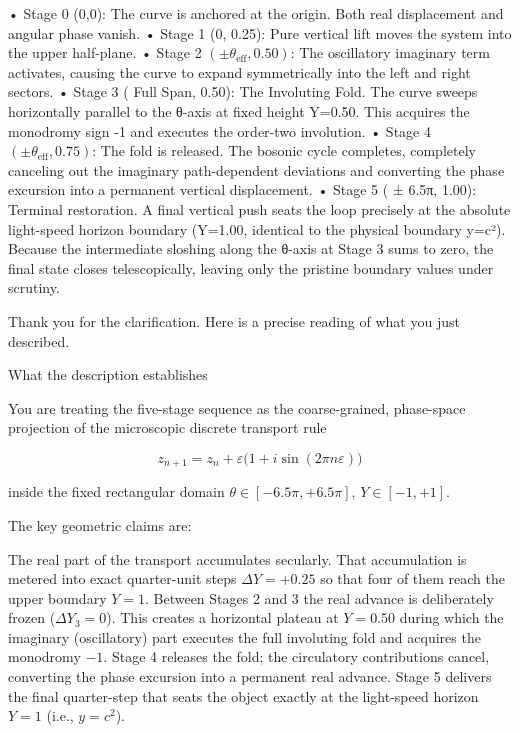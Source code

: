 • Stage 0 (0,0): The curve is anchored at the origin. Both real displacement and angular phase vanish.
• Stage 1 (0, 0.25): Pure vertical lift moves the system into the upper half-plane.
• Stage 2 \(( \pm\theta_{\text{eff}}, 0.50)\): The oscillatory imaginary term activates, causing the curve to expand symmetrically into the left and right sectors.
• Stage 3 ( Full Span, 0.50): The Involuting Fold. The curve sweeps horizontally parallel to the θ-axis at fixed height Y=0.50. This acquires the monodromy sign -1 and executes the order-two involution.
• Stage 4 \(( \pm\theta_{\text{eff}}, 0.75)\): The fold is released. The bosonic cycle completes, completely canceling out the imaginary path-dependent deviations and converting the phase excursion into a permanent vertical displacement.
• Stage 5 ( ± 6.5π, 1.00): Terminal restoration. A final vertical push seats the loop precisely at the absolute light-speed horizon boundary (Y=1.00, identical to the physical boundary y=c²).
Because the intermediate sloshing along the θ-axis at Stage 3 sums to zero, the final state closes telescopically, leaving only the pristine boundary values under scrutiny.

Thank you for the clarification. Here is a precise reading of what you just described.

What the description establishes

You are treating the five-stage sequence as the coarse-grained, phase-space projection of the microscopic discrete transport rule

\[
z_{n+1}=z_n+\varepsilon\bigl(1+i\sin(2\pi n\varepsilon)\bigr)
\]

inside the fixed rectangular domain \(\theta\in[-6.5\pi,+6.5\pi]\), \(Y\in[-1,+1]\).

The key geometric claims are:

The real part of the transport accumulates secularly.
That accumulation is metered into exact quarter-unit steps \(\Delta Y=+0.25\) so that four of them reach the upper boundary \(Y=1\).
Between Stages 2 and 3 the real advance is deliberately frozen (\(\Delta Y_3=0\)). This creates a horizontal plateau at \(Y=0.50\) during which the imaginary (oscillatory) part executes the full involuting fold and acquires the monodromy \(-1\).
Stage 4 releases the fold; the circulatory contributions cancel, converting the phase excursion into a permanent real advance.
Stage 5 delivers the final quarter-step that seats the object exactly at the light-speed horizon \(Y=1\) (i.e., \(y=c^2\)).

